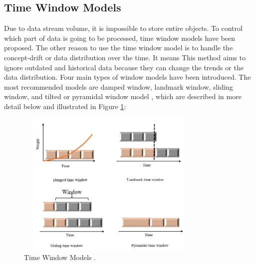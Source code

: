 \documentclass[../UNBThesis2.tex]{subfiles}
\begin{document}


\subsection{Time Window Models}
Due to data stream volume, it is impossible to store entire objects. To control which part of data is going to be processed, time window models have been proposed. The other reason to use the time window model is to handle the concept-drift or data distribution over the time. It means This method aims to ignore outdated and historical data because they can change the trends or the data distribution.
Four main types of window models have been introduced. The most recommended models are damped window, landmark window, sliding window, and tilted or pyramidal window model \cite{nguyen2015survey, mansalis2018evaluation}, which are described in more detail below and illustrated in Figure \ref{time1}:

\begin{figure}[!h]
\centering
\includegraphics[width = 9cm,height = 7cm]{image/timeW.PNG}
\caption{Time Window Models \protect\cite{carnein2019optimizing}.}
\label{time1}
\end{figure}
\end{document}
